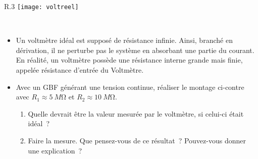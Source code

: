 \documentclass[a4paper, 11pt, final, garamond]{book}
\begin{document}
\begin{wrapfigure}[6]{R}{.3\linewidth}
    \vspace*{-35pt}
    \centering
    \texttt{[image: voltreel]}
\end{wrapfigure}
~\vspace{-20pt}
\begin{itemize}
    \item Un voltmètre idéal est supposé de résistance infinie. Ainsi, branché
        en dérivation, il ne perturbe pas le système en absorbant une partie du
        courant. En réalité, un voltmètre possède une résistance interne grande
        mais finie, appelée résistance d’entrée du Voltmètre.
    \item Avec un GBF générant une tension continue, réaliser le montage
        ci-contre avec $R_1 \approx \SI{5}{M\ohm}$ et $R_2 \approx
        \SI{10}{M\ohm}$.
        \begin{enumerate}
            \item Quelle devrait être la valeur mesurée par le voltmètre, si
                celui-ci était idéal ?
            \item Faire la mesure. Que pensez-vous de ce résultat ? Pouvez-vous
                donner une explication ?
        \end{enumerate}
\end{itemize}

\end{document}
